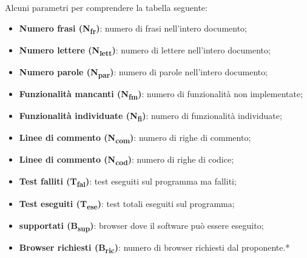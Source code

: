 Alcuni parametri per comprendere la tabella seguente:
\begin{itemize}
	\item \textbf{Numero frasi (N\textsubscript{fr})}: numero di frasi nell'intero documento;
	\item \textbf{Numero lettere (N\textsubscript{lett})}: numero di lettere nell'intero documento;
	\item \textbf{Numero parole (N\textsubscript{par})}: numero di parole nell'intero documento;
	\item \textbf{Funzionalità mancanti (N\textsubscript{fm})}: numero di funzionalità non implementate;
	\item \textbf{Funzionalità individuate (N\textsubscript{fi})}: numero di funzionalità individuate;
	\item \textbf{Linee di commento (N\textsubscript{com})}: numero di righe di commento;
	\item \textbf{Linee di commento (N\textsubscript{cod})}: numero di righe di codice;
	\item \textbf{Test falliti (T\textsubscript{fal})}: test eseguiti sul programma ma falliti;
	\item \textbf{Test eseguiti (T\textsubscript{ese})}: test totali eseguiti sul programma;
	\item \textbf{ supportati (B\textsubscript{sup})}: browser dove il software può essere eseguito;
	\item \textbf{Browser richiesti (B\textsubscript{ric})}: numero di browser richiesti dal proponente.*\
\end{itemize}
\renewcommand{\arraystretch}{1.5}
\renewcommand\extrarowheight{1.5pt}
